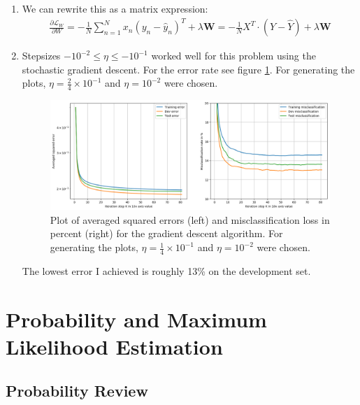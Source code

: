 \documentclass[12pt]{article}
\begin{document}
\begin{enumerate}
	\item We can rewrite this as a matrix expression:
	\begin{align*}
	\frac{\partial \mathcal{L}_W}{\partial W} = -\frac{1}{N} \sum_{n=1}^{N} x_n\left(  y_n - \hat{y}_n \right)^T + \lambda \textbf{W} = - \frac{1}{N} X^T \cdot \left( Y - \hat{Y} \right) + \lambda \textbf{W}
	\end{align*}
	\item Stepsizes $ -10^{-2} \leq \eta \le -10^{-1} $ worked well for this problem using the stochastic gradient descent. For the error rate see figure \ref{fig:3.1}. For generating the plots, $\eta = \frac{2}{4}\times 10^{-1}$ and $\eta=10^{-2}$ were chosen.
	\begin{figure}[h!]
		\centering
		\includegraphics[width=\linewidth]{./Problem_3/Problem_3.1.png}
		\caption{Plot of averaged squared errors (left) and misclassification loss in percent (right) for the gradient descent algorithm. For generating the plots, $\eta = \frac{1}{4}\times 10^{-1}$ and $\eta=10^{-2}$ were chosen.}
		\label{fig:3.1}
	\end{figure}
	The lowest error I achieved is roughly 13\% on the development set.
\end{enumerate}





\newpage

\section{Probability and Maximum Likelihood Estimation}

\subsection{Probability Review}
\end{document}
